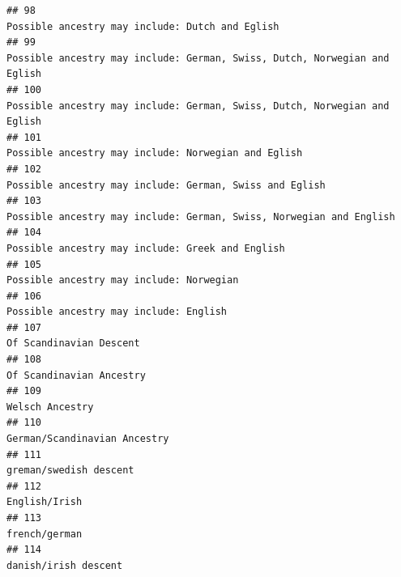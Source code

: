 \documentclass[]{article}
\begin{document}
\begin{verbatim}
## 98                                                                                                      Possible ancestry may include: Dutch and Eglish
## 99                                                                            Possible ancestry may include: German, Swiss, Dutch, Norwegian and Eglish
## 100                                                                           Possible ancestry may include: German, Swiss, Dutch, Norwegian and Eglish
## 101                                                                                                 Possible ancestry may include: Norwegian and Eglish
## 102                                                                                             Possible ancestry may include: German, Swiss and Eglish
## 103                                                                                 Possible ancestry may include: German, Swiss, Norwegian and English
## 104                                                                                                    Possible ancestry may include: Greek and English
## 105                                                                                                            Possible ancestry may include: Norwegian
## 106                                                                                                              Possible ancestry may include: English
## 107                                                                                                                             Of Scandinavian Descent
## 108                                                                                                                            Of Scandinavian Ancestry
## 109                                                                                                                                     Welsch Ancestry
## 110                                                                                                                        German/Scandinavian Ancestry
## 111                                                                                                                              greman/swedish descent
## 112                                                                                                                                       English/Irish
## 113                                                                                                                                       french/german
## 114                                                                                                                                danish/irish descent

\end{verbatim}
\end{document}
